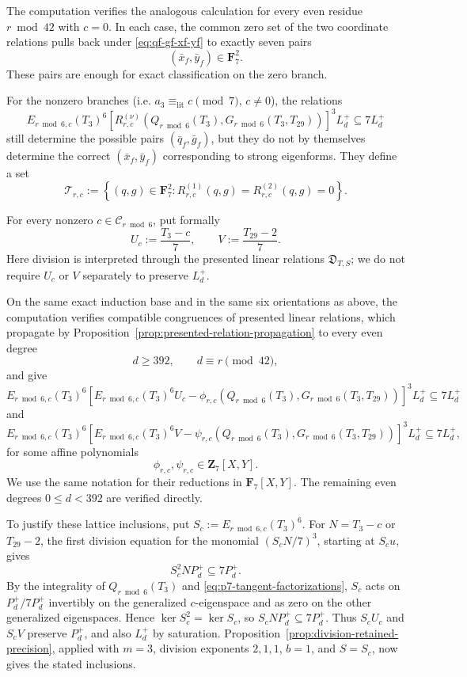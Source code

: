 \documentclass[11pt]{article}
\theoremstyle{plain}
\theoremstyle{definition}
\theoremstyle{remark}
\numberwithin{equation}{section}
\begin{document}
The computation verifies the analogous calculation for every even residue \(r\bmod42\) with \(c=0\).  In each case, the common zero set of the two coordinate relations pulls back under \eqref{eq:qf-gf-xf-yf} to exactly seven pairs \[ (\bar x_f,\bar y_f)\in\mathbf F_7^2. \] These pairs are enough for exact classification on the zero branch.

For the nonzero branches (i.e. \(a_3 \equiv_{\mathrm{lit}}c \pmod{7}\), \(c \neq 0\)), the relations \[ E_{r\bmod6,c}(T_3)^6 \left[ R_{r,c}^{(\nu)}\!\left( Q_{r\bmod6}(T_3), G_{r\bmod6}(T_3,T_{29}) \right) \right]^3L_d^+ \subseteq7L_d^+ \] still determine the possible pairs \((\bar q_f,\bar g_f)\), but they do not by themselves determine the correct \((\bar x_f,\bar y_f)\) corresponding to strong eigenforms. They define a set \[\mathcal T_{r,c}:= \left\{ (q,g)\in\mathbf F_7^2: R_{r,c}^{(1)}(q,g)=R_{r,c}^{(2)}(q,g)=0 \right\}. \]

For every nonzero \(c\in\mathcal C_{r\bmod6}\), put formally \[ U_c:=\frac{T_3-c}{7}, \qquad V:=\frac{T_{29}-2}{7}. \] Here division is interpreted through the presented linear relations \(\mathfrak D_{T,S}\); we do not require \(U_c\) or \(V\) separately to preserve \(L_d^+\). 

On the same exact induction base and in the same six orientations as above, the computation verifies compatible congruences of presented linear relations, which propagate by Proposition~\ref{prop:presented-relation-propagation} to every even degree \[ d\geq392, \qquad d\equiv r\pmod{42}, \] and give \[ E_{r\bmod6,c}(T_3)^6 \left[E_{r\bmod6,c}(T_3)^6 U_c -\phi_{r,c}\!\left( Q_{r\bmod6}(T_3), G_{r\bmod6}(T_3,T_{29}) \right) \right]^3 L_d^+ \subseteq 7L_d^+ \] and \[E_{r\bmod6,c}(T_3)^6 \left[ E_{r\bmod6,c}(T_3)^6 V -\psi_{r,c}\!\left( Q_{r\bmod6}(T_3), G_{r\bmod6}(T_3,T_{29}) \right) \right]^3 L_d^+ \subseteq 7L_d^+,\] for some affine polynomials \[ \phi_{r,c},\psi_{r,c}\in\mathbf Z_7[X,Y]. \] We use the same notation for their reductions in \(\mathbf F_7[X,Y]\). The remaining even degrees \(0\leq d<392\) are verified directly.

To justify these lattice inclusions, put \(S_c:=E_{r\bmod6,c}(T_3)^6\). For \(N=T_3-c\) or \(T_{29}-2\), the first division equation for the monomial \((S_cN/7)^3\), starting at \(S_cu\), gives \[ S_c^2N P_d^+\subseteq7P_d^+. \] By the integrality of \(Q_{r\bmod6}(T_3)\) and \eqref{eq:p7-tangent-factorizations}, \(S_c\) acts on \(P_d^+/7P_d^+\) invertibly on the generalized \(c\)-eigenspace and as zero on the other generalized eigenspaces. Hence \(\ker S_c^2=\ker S_c\), so \(S_cN P_d^+\subseteq7P_d^+\). Thus \(S_cU_c\) and \(S_cV\) preserve \(P_d^+\), and also \(L_d^+\) by saturation. Proposition~\ref{prop:division-retained-precision}, applied with \(m=3\), division exponents \(2,1,1\), \(b=1\), and \(S=S_c\), now gives the stated inclusions.
\end{document}
